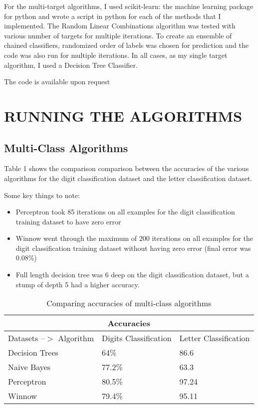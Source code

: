 \documentclass[letterpaper, 11 pt, conference]{IEEEtran}  %
\begin{document}
For the multi-target algorithms, I used scikit-learn: the machine learning package for python and wrote a script in python for each of the methods that I implemented. The Random Linear Combinations algorithm was tested with various number of targets for multiple iterations. To create an ensemble of chained classifiers, randomized order of labels was chosen for prediction and the code was also run for multiple iterations. In all cases, as my single target algorithm, I used a Decision Tree Classifier.

The code is available upon request

\section{RUNNING THE ALGORITHMS}

\subsection{\textbf{Multi-Class Algorithms}}
\renewcommand{\arraystretch}{1.5}

Table 1 shows the comparison comparison between the accuracies of the various algorithms for the digit classification dataset and the letter classification dataset.

Some key things to note:
\begin{itemize}
	\item Perceptron took 85 iterations on all examples for the digit classification training dataset to have zero error
	\item Winnow went through the maximum of 200 iterations on all examples for the digit classification training dataset without having zero error (final error was 0.08\%)
	\item Full length decision tree was 6 deep on the digit classification dataset, but a stump of depth 5 had a higher accuracy.
\end{itemize}

\vspace{3mm}

\begin{table}[h]

\caption{Comparing accuracies of multi-class algorithms}
\centering
\begin{tabular}{ |p{2.3cm}||p{2.3cm}|p{2.3cm}| }
	\hline
	\multicolumn{3}{|c|}{Accuracies} \\
	\hline
	Datasets --$>$ \newline Algorithm& Digits \newline Classification& Letter \newline Classification \\
	\hline
	Decision Trees   & 64\%    &86.6\\
	Naive Bayes&   77.2\%  &63.3\\
	Perceptron &80.5\% & 97.24\\
	Winnow    &79.4\% & 95.11\\
	\hline
\end{tabular}
\end{table}
\end{document}
